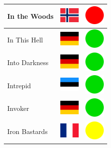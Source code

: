 \documentclass[12pt, a4paper, twoside]{report}
\begin{document}
\begin{center}
\begin{longtable}{|p{5cm}|p{2cm}|p{2cm}|}
 In the Woods                                               & \includegraphics[width=1cm]{../img/flags/no} &   \includegraphics[width=1cm]{../likes/n} \\ \hline
 In This Hell                                               & \includegraphics[width=1cm]{../img/flags/de} &   \includegraphics[width=1cm]{../likes/y} \\ \hline
 Into Darkness                                              & \includegraphics[width=1cm]{../img/flags/de} &   \includegraphics[width=1cm]{../likes/y} \\ \hline
 Intrepid                                                   & \includegraphics[width=1cm]{../img/flags/ee} &   \includegraphics[width=1cm]{../likes/y} \\ \hline
 Invoker                                                    & \includegraphics[width=1cm]{../img/flags/de} &   \includegraphics[width=1cm]{../likes/y} \\ \hline
 Iron Bastards                                              & \includegraphics[width=1cm]{../img/flags/fr} &   \includegraphics[width=1cm]{../likes/m} \\ \hline

\end{longtable}
\end{center}
\end{document}
